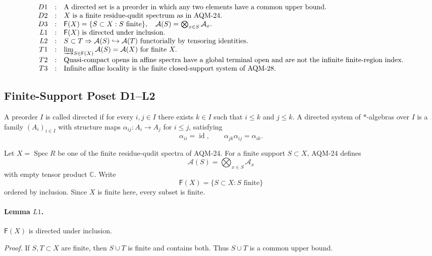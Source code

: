 \[
\begin{array}{rcl}
D1&:&\text{A directed set is a preorder in which any two elements have
      a common upper bound.}\\
D2&:&X\text{ is a finite residue-qudit spectrum as in AQM-24}.\\
D3&:&\mathsf F(X)=\{S\subset X:S\text{ finite}\},\quad
      \mathcal A(S)=\bigotimes_{x\in S}\mathcal A_x.\\
L1&:&\mathsf F(X)\text{ is directed under inclusion.}\\
L2&:&S\subset T\Rightarrow
      \mathcal A(S)\hookrightarrow\mathcal A(T)
      \text{ functorially by tensoring identities.}\\
T1&:&\varinjlim_{S\in\mathsf F(X)}\mathcal A(S)=\mathcal A(X)
      \text{ for finite }X.\\
T2&:&\text{Quasi-compact opens in affine spectra have a global terminal
      open and are not the infinite finite-region index.}\\
T3&:&\text{Infinite affine locality is the finite closed-support system of
      AQM-28.}
\end{array}
\]

\subsection{Finite-Support Poset D1--L2}

A preorder \(I\) is called directed if for every \(i,j\in I\) there exists
\(k\in I\) such that \(i\leq k\) and \(j\leq k\).  A directed system of
\(*\)-algebras over \(I\) is a family \((A_i)_{i\in I}\) with structure maps
\(\alpha_{ij}:A_i\to A_j\) for \(i\leq j\), satisfying
\[
  \alpha_{ii}=\operatorname{id},\qquad
  \alpha_{jk}\alpha_{ij}=\alpha_{ik}.
\]

Let \(X=\operatorname{Spec}R\) be one of the finite residue-qudit spectra of
AQM-24.  For a finite support \(S\subset X\), AQM-24 defines
\[
  \mathcal A(S)=\bigotimes_{x\in S}\mathcal A_x
\]
with empty tensor product \(\mathbb C\).  Write
\[
  \mathsf F(X)=\{S\subset X:S\text{ finite}\}
\]
ordered by inclusion.  Since \(X\) is finite here, every subset is finite.

\paragraph{Lemma \(L1\).}
\(\mathsf F(X)\) is directed under inclusion.

\emph{Proof.}
If \(S,T\subset X\) are finite, then \(S\cup T\) is finite and contains both.
Thus \(S\cup T\) is a common upper bound.

